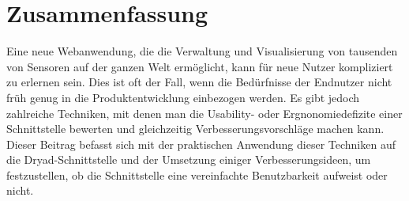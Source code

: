 \chapter*{Zusammenfassung}

Eine neue Webanwendung, die die Verwaltung und Visualisierung von tausenden von Sensoren auf der ganzen Welt ermöglicht, kann für neue Nutzer kompliziert zu erlernen sein.
Dies ist oft der Fall, wenn die Bedürfnisse der Endnutzer nicht früh genug in die Produktentwicklung einbezogen werden.
Es gibt jedoch zahlreiche Techniken, mit denen man die Usability- oder Ergnonomiedefizite einer Schnittstelle bewerten und gleichzeitig Verbesserungsvorschläge machen kann.
Dieser Beitrag befasst sich mit der praktischen Anwendung dieser Techniken auf die Dryad-Schnittstelle und der Umsetzung einiger Verbesserungsideen, um festzustellen, ob die Schnittstelle eine vereinfachte Benutzbarkeit aufweist oder nicht.
